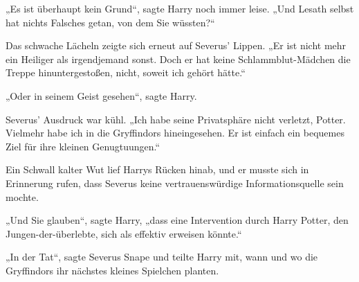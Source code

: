 „Es ist überhaupt kein Grund“, sagte Harry noch immer leise.
„Und Lesath selbst hat nichts Falsches getan, von dem Sie wüssten?“

Das schwache Lächeln zeigte sich erneut auf Severus’ Lippen.
„Er ist nicht mehr ein Heiliger als irgendjemand sonst. Doch er hat keine Schlammblut-Mädchen die Treppe hinuntergestoßen, nicht, soweit ich gehört hätte.“

„Oder in seinem Geist gesehen“, sagte Harry.

Severus’ Ausdruck war kühl.
„Ich habe seine Privatsphäre nicht verletzt, Potter. Vielmehr habe ich in die Gryffindors hineingesehen. Er ist einfach ein bequemes Ziel für ihre kleinen Genugtuungen.“

Ein Schwall kalter Wut lief Harrys Rücken hinab, und er musste sich in Erinnerung rufen, dass Severus keine vertrauenswürdige Informationsquelle sein mochte.

„Und Sie glauben“, sagte Harry, „dass eine Intervention durch Harry Potter, den Jungen-der-überlebte, sich als effektiv erweisen könnte.“

„In der Tat“, sagte Severus Snape und teilte Harry mit, wann und wo die Gryffindors ihr nächstes kleines Spielchen planten.

\later

